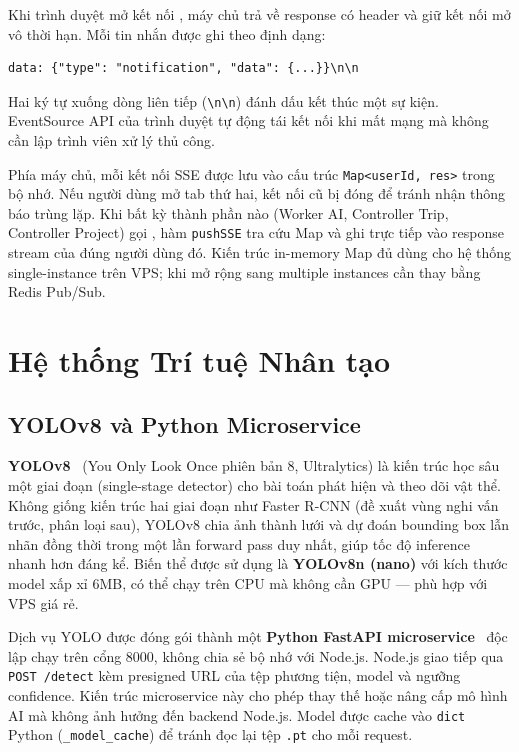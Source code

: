 \documentclass[../DoAn.tex]{subfiles}
\begin{document}
Khi trình duyệt mở kết nối , máy chủ trả về response có header  và giữ kết nối mở vô thời hạn. Mỗi tin nhắn được ghi theo định dạng:
\begin{verbatim}
data: {"type": "notification", "data": {...}}\n\n
\end{verbatim}
Hai ký tự xuống dòng liên tiếp (\texttt{\textbackslash{}n\textbackslash{}n}) đánh dấu kết thúc một sự kiện. EventSource API của trình duyệt tự động tái kết nối khi mất mạng mà không cần lập trình viên xử lý thủ công.

Phía máy chủ, mỗi kết nối SSE được lưu vào cấu trúc \texttt{Map<userId, res>} trong bộ nhớ. Nếu người dùng mở tab thứ hai, kết nối cũ bị đóng để tránh nhận thông báo trùng lặp. Khi bất kỳ thành phần nào (Worker AI, Controller Trip, Controller Project) gọi , hàm \texttt{pushSSE} tra cứu Map và ghi trực tiếp vào response stream của đúng người dùng đó. Kiến trúc in-memory Map đủ dùng cho hệ thống single-instance trên VPS; khi mở rộng sang multiple instances cần thay bằng Redis Pub/Sub.

\section{Hệ thống Trí tuệ Nhân tạo}
\label{section:3.4}

\subsection{YOLOv8 và Python Microservice}

\textbf{YOLOv8}~\cite{yolov8} (You Only Look Once phiên bản 8, Ultralytics) là kiến trúc học sâu một giai đoạn (single-stage detector) cho bài toán phát hiện và theo dõi vật thể. Không giống kiến trúc hai giai đoạn như Faster R-CNN (đề xuất vùng nghi vấn trước, phân loại sau), YOLOv8 chia ảnh thành lưới và dự đoán bounding box lẫn nhãn đồng thời trong một lần forward pass duy nhất, giúp tốc độ inference nhanh hơn đáng kể. Biến thể được sử dụng là \textbf{YOLOv8n (nano)} với kích thước model xấp xỉ 6MB, có thể chạy trên CPU mà không cần GPU --- phù hợp với VPS giá rẻ.

Dịch vụ YOLO được đóng gói thành một \textbf{Python FastAPI microservice}~\cite{fastapi} độc lập chạy trên cổng 8000, không chia sẻ bộ nhớ với Node.js. Node.js giao tiếp qua \texttt{POST /detect} kèm presigned URL của tệp phương tiện, model và ngưỡng confidence. Kiến trúc microservice này cho phép thay thế hoặc nâng cấp mô hình AI mà không ảnh hưởng đến backend Node.js. Model được cache vào \texttt{dict} Python (\texttt{\_model\_cache}) để tránh đọc lại tệp \texttt{.pt} cho mỗi request.
\end{document}
